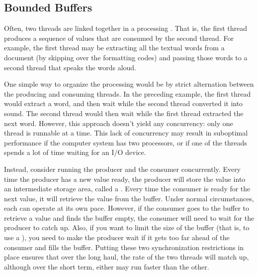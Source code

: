 \subsection{Bounded Buffers}\label{bounded-buffers-section}

Often, two threads are linked together in a processing
.  That is,
the first thread produces a sequence of values that are consumed by
the second thread.  For example, the first thread may be extracting
all the textual words from a document (by skipping over the formatting
codes) and passing those words to a second thread that speaks the
words aloud.

One simple way to organize the processing would be by strict
alternation between the producing and consuming threads.  In the preceding
example, the first thread would extract a word, and then wait while
the second thread converted it into sound.  The second thread would
then wait while the first thread extracted the next word.  However,
this approach doesn't yield any concurrency: only one thread is
runnable at a time.  This lack of concurrency may result in suboptimal
performance if the computer system has two processors, or
if one of the threads spends a lot of time waiting for an I/O device.

Instead, consider running the producer and the consumer
concurrently.  Every time the producer has a new value ready, the producer will
store the value into an intermediate storage area, called a .
Every time the consumer is ready for the next value, it will retrieve
the value from the buffer.  Under normal circumstances, each can operate at
its own pace.  However, if the consumer goes to the buffer to retrieve
a value and finds the buffer empty, the consumer will need to wait for the
producer to catch up.  Also, if you want to limit the size of the
buffer (that is, to use a ), you need to make the producer wait
if it gets too far ahead of the consumer and fills the buffer.  Putting
these two synchronization restrictions in place ensures that over the
long haul, the rate of the two threads will match up, although
over the short term, either may run faster than the other.

